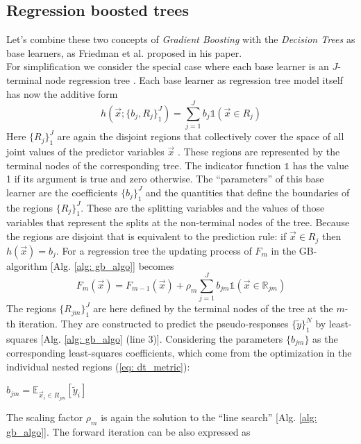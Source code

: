 \documentclass[12pt, a4paper]{article}
\begin{document}
\subsection{Regression boosted trees}
\label{sec: regr_boosted_trees}
Let's combine these two concepts of \textit{Gradient Boosting} with the \textit{Decision Trees} as base learners, as Friedman et al. \cite{Friedman2001} proposed in his paper. \\
For simplification we consider the special case where each base learner is an $J$-terminal node regression tree \cite{Breiman1984}. Each base learner as regression tree model itself has now the additive form
\begin{equation}
    h(\vec{x};\{b_j,R_j\}_1^J) = \sum_{j=1}^J b_j \mathds{1}(\vec{x} \in R_j)
\end{equation}
Here $\{R_j\}_1^J$ are again the disjoint regions that collectively cover the space of all joint values of the predictor variables $\vec{x}$ \cite{Friedman2001}. These regions are represented by the terminal nodes of the corresponding tree. The indicator function $\mathds{1}$ has the value 1 if its argument is true and zero otherwise. The ``parameters'' of this base learner are the coefficients $\{b_j\}_1^J$ and the quantities that define the boundaries of the regions $\{R_j\}_1^J$. These are the splitting variables and the values of those variables that represent the splits at the non-terminal nodes of the tree. Because the regions are disjoint that is equivalent to the prediction rule: if $\vec{x} \in R_j$
then $h(\vec{x}) = b_j$.
For a regression tree the updating process of $F_m$ in the GB-algorithm [Alg. \ref{alg: gb_algo}] becomes
\begin{equation}
    F_m(\vec{x}) = F_{m-1}(\vec{x}) + \rho_m \sum_{j=1}^J b_{jm} \mathds{1}(\vec{x} \in \mathbb{R}_{jm})
\end{equation}
The regions $\{R_{jm}\}_1^J$ are here defined by the terminal nodes of the tree at the $m$-th iteration. They are constructed to predict the pseudo-responses $\{\tilde{y}\}_1^N$ by least-squares [Alg. \ref{alg: gb_algo} (line 3)]. Considering the parameters $\{b_{jm}\}$ as the corresponding least-squares coefficients, which come from the optimization in the individual nested regions (\ref{eq: dt_metric}):
\begin{center}
    $b_{jm} = \mathbb{E}_{\vec{x}_i \in R_{jm}}[\tilde{y}_i]$
\end{center}
The scaling factor $\rho_m$ is again the solution to the ``line search'' [Alg. \ref{alg: gb_algo}].
The forward iteration can be also expressed as
\end{document}
